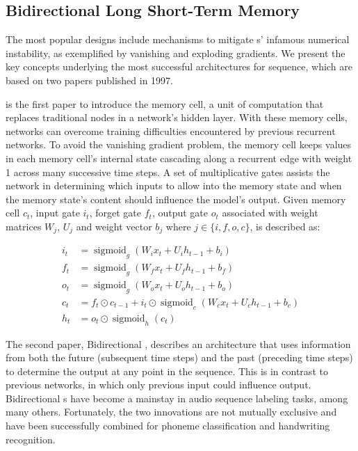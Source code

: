\subsection{Bidirectional Long Short-Term Memory}

The most popular designs include mechanisms to mitigate s' infamous numerical instability, as exemplified by vanishing and exploding gradients.
We present the key concepts underlying the most successful  architectures for sequence, which are based on two papers published in 1997.

 \cite{lstm1997} is the first paper to introduce the memory cell, a unit of computation that replaces traditional nodes in a network's hidden layer.
With these memory cells, networks can overcome training difficulties encountered by previous recurrent networks. 
To avoid the vanishing gradient problem, the memory cell keeps values in each memory cell's internal state cascading along a recurrent edge with weight 1 across many successive time steps. 
A set of multiplicative gates assists the network in determining which inputs to allow into the memory state and when the memory state's content should influence the model's output.
Given memory cell $c_t$, input gate $i_t$, forget gate $f_t$, output gate $o_t$ associated with weight matrices $W_j$, $U_j$ and weight vector $b_j$ where $j \in \{i, f, o, c\}$,  is described as:

\begin{equation}
\begin{aligned}
   i_{t} &= \operatorname{sigmoid}_{g}(W_{i}x_{t} + U_{i}h_{t-1} + b_{i}) \\
   f_{t} &= \operatorname{sigmoid}_{g}(W_{f}x_{t} + U_{f}h_{t-1} + b_{f}) \\
   o_{t} &= \operatorname{sigmoid}_{g}(W_{o}x_{t} + U_{o}h_{t-1} + b_{o}) \\
   c_{t} &= f_{t} \odot c_{t-1} + i_{t} \odot \operatorname{sigmoid}_{c}(W_{c}x_{t} + U_{c}h_{t-1} + b_{c}) \\
   h_{t} &= o_{t} \odot \operatorname{sigmoid}_{h}(c_{t}) 
\end{aligned}
\end{equation}

The second paper, Bidirectional  \cite{brnn1997}, describes an architecture that uses information from both the future (subsequent time steps) and the past (preceding time steps) to determine the output at any point in the sequence. 
This is in contrast to previous networks, in which only previous input could influence output. 
Bidirectional s have become a mainstay in audio sequence labeling tasks, among many others. 
Fortunately, the two innovations are not mutually exclusive and have been successfully combined for phoneme classification and handwriting recognition.


